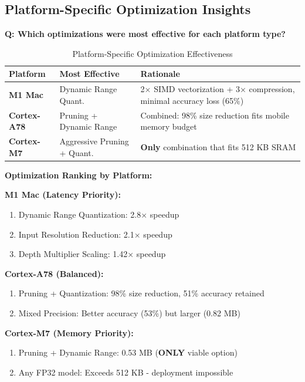 \documentclass[10pt, a4paper]{article}
\begin{document}
\subsection{Platform-Specific Optimization Insights}

\textbf{Q: Which optimizations were most effective for each platform type?}

\begin{table}[H]
\centering
\footnotesize
\begin{tabular}{|l|p{4cm}|p{6cm}|}
\hline
\textbf{Platform} & \textbf{Most Effective} & \textbf{Rationale} \\
\hline
\textbf{M1 Mac} & Dynamic Range Quant. & 2× SIMD vectorization + 3× compression, minimal accuracy loss (65\%) \\
\textbf{Cortex-A78} & Pruning + Dynamic Range & Combined: 98\% size reduction fits mobile memory budget \\
\textbf{Cortex-M7} & Aggressive Pruning + Quant. & \textbf{Only} combination that fits 512 KB SRAM \\
\hline
\end{tabular}
\caption{Platform-Specific Optimization Effectiveness}
\end{table}

\textbf{Optimization Ranking by Platform:}

\textbf{M1 Mac (Latency Priority):}
\begin{enumerate}
    \item Dynamic Range Quantization: 2.8× speedup
    \item Input Resolution Reduction: 2.1× speedup
    \item Depth Multiplier Scaling: 1.42× speedup
\end{enumerate}

\textbf{Cortex-A78 (Balanced):}
\begin{enumerate}
    \item Pruning + Quantization: 98\% size reduction, 51\% accuracy retained
    \item Mixed Precision: Better accuracy (53\%) but larger (0.82 MB)
\end{enumerate}

\textbf{Cortex-M7 (Memory Priority):}
\begin{enumerate}
    \item Pruning + Dynamic Range: 0.53 MB (\textbf{ONLY} viable option)
    \item Any FP32 model: Exceeds 512 KB - deployment impossible
\end{enumerate}
\end{document}
